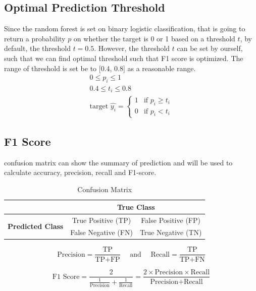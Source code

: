 \documentclass[11pt,a4paper]{article}
\begin{document}
    \subsection{Optimal Prediction Threshold}
    Since the random forest is set on binary logistic classification, that is going to return a probability $p$ on whether the target is 0 or 1 based on a threshold $t$, by default, the threshold $t = 0.5$. However, the threshold $t$ can be set by ourself, such that we can find optimal threshold such that F1 score is optimized. The range of threshold is set be to [0.4, 0.8] as a reasonable range.
    \begin{gather*} 
        0 \leq p_i \leq 1 \\ 
        0.4 \leq t_i \leq 0.8 \\
        \text{target } \hat{y_i} =
        \begin{cases}
            1 & \text{if } p_i \geq t_i \\
            0 & \text{if } p_i < t_i
        \end{cases}
    \end{gather*}
    
    \subsection{F1 Score}
    confusion matrix can show the summary of prediction and will be used to calculate accuracy, precision, recall and F1-score. 
    \begin{table}[H]
        \centering
        \begin{tabular}{c|c|c}
             & \multicolumn{2}{c}{\textbf{True Class}} \\
            \hline
            \multirow{2}{*}{\textbf{Predicted Class}} & True Positive (TP) & False Positive (FP) \\
            \cline{2-3}
             & False Negative (FN) & True Negative (TN)
        \end{tabular}
        \caption{Confusion Matrix}
        \label{tab:confusion_matrix}
    \end{table}

    \[
        \text{Precision} = \frac{\text{TP}}{\text{TP} + \text{FP}}
        \quad \text{ and } \quad
        \text{Recall} = \frac{\text{TP}}{\text{TP} + \text{FN}}
    \]
    
    \[
        \text{F1 Score} 
        = \frac{2}{\frac{1}{\text{Precision}} + \frac{1}{\text{Recall}}}
        = \frac{2 \times \text{Precision} \times \text{Recall}}{\text{Precision} + \text{Recall}}
    \]
    
\end{document}
